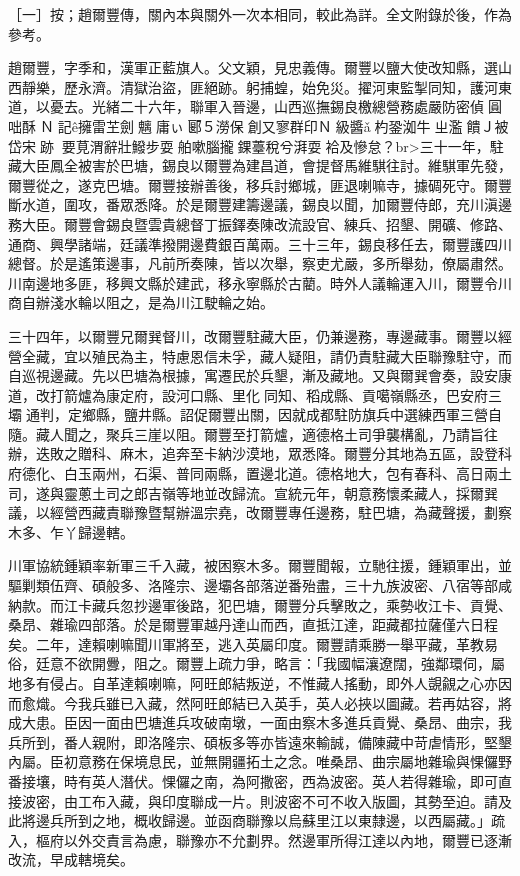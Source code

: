 \begin{pinyinscope}
［一］按；趙爾豐傳，關內本與關外一次本相同，較此為詳。全文附錄於後，作為參考。

趙爾豐，字季和，漢軍正藍旗人。父文穎，見忠義傳。爾豐以鹽大使改知縣，選山西靜樂，歷永濟。清獄治盜，匪絕跡。躬捕蝗，始免災。擢河東監掣同知，護河東道，以憂去。光緒二十六年，聯軍入晉邊，山西巡撫錫良檄總營務處嚴防密偵圓咄酥Ｎ記ê擁雷芏劍魑庸ぃ郾５澇保創又寥群印Ｎ級醬ǎ杓銎洳牛ㄓ濫饋Ｊ被岱宋跡要莧渭辭壯鱍步耍舶嗽腦攏錁薹稅兮湃耍袷及慘怠？br>三十一年，駐藏大臣鳳全被害於巴塘，錫良以爾豐為建昌道，會提督馬維騏往討。維騏軍先發，爾豐從之，遂克巴塘。爾豐接辦善後，移兵討鄉城，匪退喇嘛寺，據碉死守。爾豐斷水道，圍攻，番眾悉降。於是爾豐建籌邊議，錫良以聞，加爾豐侍郎，充川滇邊務大臣。爾豐會錫良暨雲貴總督丁振鐸奏陳改流設官、練兵、招墾、開礦、修路、通商、興學諸端，廷議準撥開邊費銀百萬兩。三十三年，錫良移任去，爾豐護四川總督。於是遙策邊事，凡前所奏陳，皆以次舉，察吏尤嚴，多所舉劾，僚屬肅然。川南邊地多匪，移興文縣於建武，移永寧縣於古藺。時外人議輪運入川，爾豐令川商自辦淺水輪以阻之，是為川江駛輪之始。

三十四年，以爾豐兄爾巽督川，改爾豐駐藏大臣，仍兼邊務，專邊藏事。爾豐以經營全藏，宜以殖民為主，特慮恩信未孚，藏人疑阻，請仍責駐藏大臣聯豫駐守，而自巡視邊藏。先以巴塘為根據，寓遷民於兵墾，漸及藏地。又與爾巽會奏，設安康道，改打箭爐為康定府，設河口縣、里化同知、稻成縣、貢噶嶺縣丞，巴安府三壩通判，定鄉縣，鹽井縣。詔促爾豐出關，因就成都駐防旗兵中選練西軍三營自隨。藏人聞之，聚兵三崖以阻。爾豐至打箭爐，適德格土司爭襲構亂，乃請旨往辦，迭敗之贈科、麻木，追奔至卡納沙漠地，眾悉降。爾豐分其地為五區，設登科府德化、白玉兩州，石渠、普同兩縣，置邊北道。德格地大，包有春科、高日兩土司，遂與靈蔥土司之郎吉嶺等地並改歸流。宣統元年，朝意務懷柔藏人，採爾巽議，以經營西藏責聯豫暨幫辦溫宗堯，改爾豐專任邊務，駐巴塘，為藏聲援，劃察木多、乍丫歸邊轄。

川軍協統鍾穎率新軍三千入藏，被困察木多。爾豐聞報，立馳往援，鍾穎軍出，並驅剿類伍齊、碩般多、洛隆宗、邊壩各部落逆番殆盡，三十九族波密、八宿等部咸納款。而江卡藏兵忽抄邊軍後路，犯巴塘，爾豐分兵擊敗之，乘勢收江卡、貢覺、桑昂、雜瑜四部落。於是爾豐軍越丹達山而西，直抵江達，距藏都拉薩僅六日程矣。二年，達賴喇嘛聞川軍將至，逃入英屬印度。爾豐請乘勝一舉平藏，革教易俗，廷意不欲開釁，阻之。爾豐上疏力爭，略言：「我國幅瀼遼闊，強鄰環伺，屬地多有侵占。自革達賴喇嘛，阿旺郎結叛逆，不惟藏人搖動，即外人覬覦之心亦因而愈熾。今我兵雖已入藏，然阿旺郎結已入英手，英人必挾以圖藏。若再姑容，將成大患。臣因一面由巴塘進兵攻破南墩，一面由察木多進兵貢覺、桑昂、曲宗，我兵所到，番人親附，即洛隆宗、碩板多等亦皆遠來輸誠，備陳藏中苛虐情形，堅墾內屬。臣初意務在保境息民，並無開疆拓土之念。唯桑昂、曲宗屬地雜瑜與惈儸野番接壤，時有英人潛伏。惈儸之南，為阿撒密，西為波密。英人若得雜瑜，即可直接波密，由工布入藏，與印度聯成一片。則波密不可不收入版圖，其勢至迫。請及此將邊兵所到之地，概收歸邊。並函商聯豫以烏蘇里江以東隸邊，以西屬藏。」疏入，樞府以外交責言為慮，聯豫亦不允劃界。然邊軍所得江達以內地，爾豐已逐漸改流，早成轄境矣。


\end{pinyinscope}

